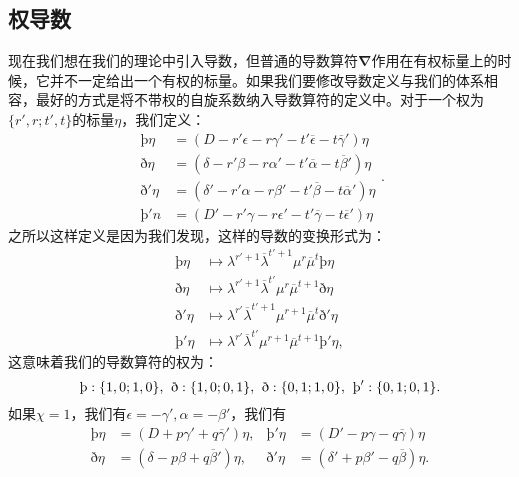 \subsection{权导数}

现在我们想在我们的理论中引入导数，但普通的导数算符$\boldsymbol{\nabla }$作用在有权标量上的时候，它并不一定给出一个有权的标量。如果我们要修改导数定义与我们的体系相容，最好的方式是将不带权的自旋系数纳入导数算符的定义中。对于一个权为$\{r',r;t',t\}$的标量$\eta $，我们定义：
\begin{equation*}
	\begin{aligned}
		\text{þ}\eta  & =( D-r'\epsilon -r\gamma '-t'\overline{\epsilon } -t\overline{\gamma } ') \eta \\
		\text{ð} \eta  & =(\delta -r'\beta -r\alpha '-t'\overline{\alpha } -t\overline{\beta } ')\eta \\
		\text{ð} '\eta  & =( \delta '-r'\alpha -r\beta '-t'\overline{\beta } -t\overline{\alpha } ') \eta \\
		\text{þ}'n & =( D'-r'\gamma -r\epsilon '-t'\overline{\gamma } -t\overline{\epsilon } ') \eta 
	\end{aligned} .
\end{equation*}
之所以这样定义是因为我们发现，这样的导数的变换形式为：
\begin{equation*}
	\begin{aligned}
		\text{þ}\eta  & \mapsto \lambda ^{r'+1}\overline{\lambda }^{t'+1} \mu ^{r}\overline{\mu }^{t} \text{þ}\eta \\
		\text{ð} \eta  & \mapsto \lambda ^{r'+1}\overline{\lambda }^{t'} \mu ^{r}\overline{\mu }^{t+1} \text{ð} \eta \\
		\text{ð} '\eta  & \mapsto \lambda ^{r'}\overline{\lambda }^{t'+1} \mu ^{r+1}\overline{\mu }^{t} \text{ð} '\eta \\
		\text{þ}'\eta  & \mapsto \lambda ^{r'}\overline{\lambda }^{t'} \mu ^{r+1}\overline{\mu }^{t+1} \text{þ}'\eta ,
	\end{aligned}
\end{equation*}
这意味着我们的导数算符的权为：
\begin{equation*}
	\text{þ}:\{1,0;1,0\} ,\kern+0.4em \text{ð} :\{1,0;0,1\} ,\kern+0.4em \text{ð} :\{0,1;1,0\} ,\kern+0.4em \text{þ}':\{0,1;0,1\} .
\end{equation*}
如果$\chi =1$，我们有$\epsilon =-\gamma ',\alpha =-\beta '$，我们有
\begin{equation*}
	\begin{aligned}
		\text{þ}\eta  & =( D+p\gamma '+q\overline{\gamma } ') \eta , & \text{þ}'\eta  & =( D'-p\gamma -q\overline{\gamma }) \eta \\
		\text{ð} \eta  & =( \delta -p\beta +q\overline{\beta } ') \eta , & \text{ð} '\eta  & =( \delta '+p\beta '-q\overline{\beta }) \eta .
	\end{aligned}
\end{equation*}
